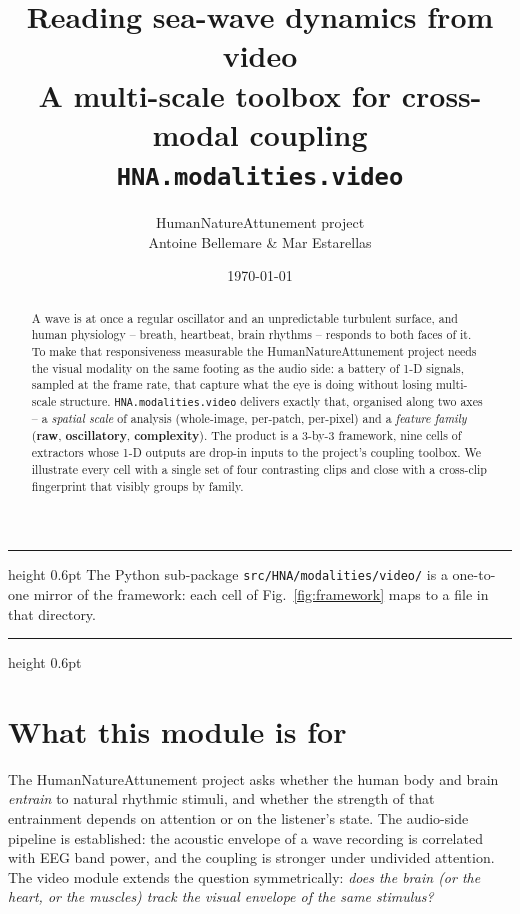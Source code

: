 \documentclass[11pt,a4paper]{article}
\title{\vspace{-1cm}\Huge\bfseries Reading sea-wave dynamics from video \\[2pt]
  \large\mdseries A multi-scale toolbox for cross-modal coupling \\[2pt]
  \large\mdseries \texttt{HNA.modalities.video}}
\author{HumanNatureAttunement project \\[-2pt]
  \small Antoine Bellemare \& Mar Estarellas}
\date{\small \today}
\newcommand{\code}[1]{\texttt{\small #1}}
\newcommand{\famraw}[1]{\textcolor{famraw}{\textbf{#1}}}
\newcommand{\famosc}[1]{\textcolor{famosc}{\textbf{#1}}}
\newcommand{\famcpl}[1]{\textcolor{famcpl}{\textbf{#1}}}
\begin{document}
\maketitle
\thispagestyle{plain}

\begin{abstract}\noindent
A wave is at once a regular oscillator and an unpredictable turbulent
surface, and human physiology -- breath, heartbeat, brain rhythms --
responds to both faces of it. To make that responsiveness measurable
the HumanNatureAttunement project needs the visual modality on the
same footing as the audio side: a battery of 1-D signals, sampled at
the frame rate, that capture what the eye is doing without losing
multi-scale structure. \code{HNA.modalities.video} delivers exactly that,
organised along two axes -- a \emph{spatial scale} of analysis
(whole-image, per-patch, per-pixel) and a \emph{feature family}
(\famraw{raw}, \famosc{oscillatory}, \famcpl{complexity}). The product
is a 3-by-3 framework, nine cells of extractors whose 1-D outputs are
drop-in inputs to the project's coupling toolbox. We illustrate every
cell with a single set of four contrasting clips and close with a
cross-clip fingerprint that visibly groups by family.
\end{abstract}

\vspace{4pt}\hrule height 0.6pt\vspace{6pt}
{\small\color{rule}
The Python sub-package \code{src/HNA/modalities/video/} is a
one-to-one mirror of the framework: each cell of
Fig.~\ref{fig:framework} maps to a file in that directory.}
\vspace{6pt}\hrule height 0.6pt
\tableofcontents
\vspace{6pt}

\section{What this module is for}\label{sec:intro}

The HumanNatureAttunement project asks whether the human body and
brain \emph{entrain} to natural rhythmic stimuli, and whether the
strength of that entrainment depends on attention or on the listener's
state. The audio-side pipeline is established: the acoustic envelope
of a wave recording is correlated with EEG band power, and the
coupling is stronger under undivided attention. The video module
extends the question symmetrically: \emph{does the brain (or the
heart, or the muscles) track the visual envelope of the same
stimulus?}
\end{document}
